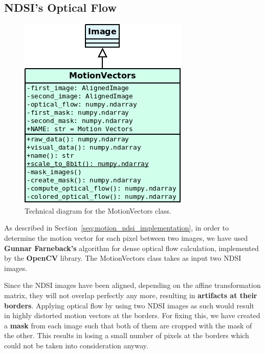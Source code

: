\documentclass[12pt, a4paper]{report}
\begin{document}

	\subsection{NDSI's Optical Flow}
	
	\begin{figure}[h!]
		\centering
		\includegraphics[scale=0.6]{../images/motion_vectors_diagram.png}
		\caption{Technical diagram for the MotionVectors class.}
		\label{fig:motion_vectors_diagram}
	\end{figure}

	\par As described in Section~\ref{seq:motion_ndsi_implementation}, in order to determine the motion vector for each pixel between two images, we have used \textbf{Gunnar Farneback's} algorithm for dense optical flow calculation, implemented by the \textbf{OpenCV} library. The MotionVectors class takes as input two NDSI images.
	
	\par Since the NDSI images have been aligned, depending on the affine transformation matrix, they will not overlap perfectly any more, resulting in \textbf{artifacts at their borders}. Applying optical flow by using two NDSI images as such would result in highly distorted motion vectors at the borders. For fixing this, we have created a \textbf{mask} from each image such that both of them are cropped with the mask of the other. This results in losing a small number of pixels at the borders which could not be taken into consideration anyway.
	
\end{document}
